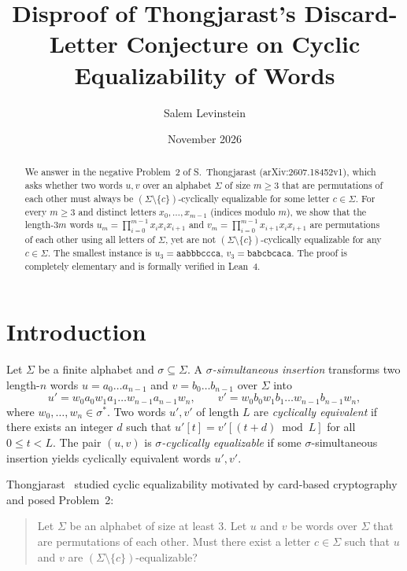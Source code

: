 \documentclass[11pt]{article}
\title{Disproof of Thongjarast's Discard-Letter Conjecture on Cyclic Equalizability of Words}
\author{Salem Levinstein}
\date{November 2026}
\begin{document}
\maketitle

\begin{abstract}
We answer in the negative Problem~2 of S.~Thongjarast
(arXiv:2607.18452v1), which asks whether two words $u, v$ over an alphabet
$\Sigma$ of size $m \ge 3$ that are permutations of each other must always be
$(\Sigma \setminus \{c\})$-cyclically equalizable for some letter $c \in \Sigma$.
For every $m \ge 3$ and distinct letters $x_0, \dots, x_{m-1}$ (indices modulo
$m$), we show that the length-$3m$ words
$u_m = \prod_{i=0}^{m-1} x_i x_i x_{i+1}$ and
$v_m = \prod_{i=0}^{m-1} x_{i+1} x_i x_{i+1}$
are permutations of each other using all letters of $\Sigma$, yet are not
$(\Sigma \setminus \{c\})$-cyclically equalizable for any $c \in \Sigma$.
The smallest instance is $u_3 = \texttt{aabbbccca}$, $v_3 = \texttt{babcbcaca}$.
The proof is completely elementary and is formally verified in Lean~4.
\end{abstract}

\section{Introduction}

Let $\Sigma$ be a finite alphabet and $\sigma \subseteq \Sigma$. A
\emph{$\sigma$-simultaneous insertion} transforms two length-$n$ words
$u = a_0 \dots a_{n-1}$ and $v = b_0 \dots b_{n-1}$ over $\Sigma$ into
\[
u' = w_0 a_0 w_1 a_1 \dots w_{n-1} a_{n-1} w_n, \qquad
v' = w_0 b_0 w_1 b_1 \dots w_{n-1} b_{n-1} w_n,
\]
where $w_0, \dots, w_n \in \sigma^*$. Two words $u', v'$ of length $L$ are
\emph{cyclically equivalent} if there exists an integer $d$ such that
$u'[t] = v'[(t + d) \bmod L]$ for all $0 \le t < L$. The pair $(u, v)$ is
\emph{$\sigma$-cyclically equalizable} if some $\sigma$-simultaneous insertion
yields cyclically equivalent words $u', v'$.

Thongjarast~\cite{Th2026} studied cyclic equalizability motivated by
card-based cryptography and posed Problem~2:

\begin{quote}
Let $\Sigma$ be an alphabet of size at least $3$. Let $u$ and $v$ be words over
$\Sigma$ that are permutations of each other. Must there exist a letter
$c \in \Sigma$ such that $u$ and $v$ are $(\Sigma \setminus \{c\})$-equalizable?
\end{quote}
\end{document}
